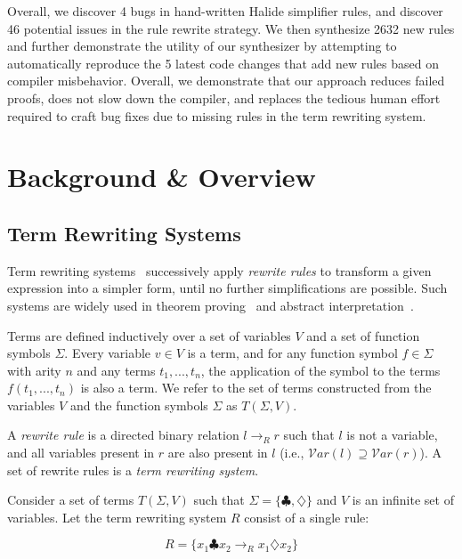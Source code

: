 \documentclass[sigplan,10pt,review,anonymous]{acmart}\settopmatter{printfolios=true,printccs=false,printacmref=false}
\newcommand{\NumRulesFixed}{{\color{red} 4}\xspace}
\newcommand{\NumOrderingProblems}{{\color{red} 46}\xspace}
\newcommand{\NumRulesSynthesized}{{\color{red} 2632}\xspace}
\newcommand{\NumBugsAutomated}{{\color{red} 5}\xspace}
\begin{document}
Overall, we discover \NumRulesFixed bugs in hand-written Halide simplifier rules, and discover \NumOrderingProblems
potential issues in the rule rewrite strategy.  We then synthesize \NumRulesSynthesized new rules 
and further demonstrate the utility of our synthesizer by attempting to
automatically reproduce the \NumBugsAutomated latest code changes that add new
rules based on compiler misbehavior.
Overall, we demonstrate that our approach
reduces failed proofs,  does not slow down the compiler, and replaces the
tedious human effort required to craft bug fixes due to missing rules in the
term rewriting system.

\section{Background \& Overview}
\subsection{Term Rewriting Systems}
Term rewriting systems~\cite{gorn1967} successively apply \textit{rewrite rules} to transform a given
expression into a simpler form, until no further simplifications are possible.  Such systems are widely
used in theorem proving~\cite{baader1999term} and abstract interpretation~\cite{}.

Terms are defined inductively over a set of variables $V$ and a set of function symbols $\Sigma$. Every variable $v \in V$ is a term, and for any function symbol $f \in \Sigma$ with arity $n$ and any terms $t_1, ..., t_n$, the application of the symbol to the terms $f(t_1, ..., t_n)$ is also a term. We refer to the set of terms constructed from the variables $V$ and the function symbols $\Sigma$ as $T(\Sigma, V)$.

A \emph{rewrite rule} is a directed binary relation $l \rightarrow_R r$ such that $l$ is not a variable, and all variables present in $r$ are also present in $l$ (i.e., $\mathcal{V}ar(l) \supseteq \mathcal{V}ar(r)$). A set of rewrite rules is a \emph{term rewriting system}.

Consider a set of terms $T(\Sigma, V)$ such that $\Sigma = \{\clubsuit, \diamondsuit\}$ and $V$ is an infinite set of variables. Let the term rewriting system $R$ consist of a single rule:

\[ R = \{ x_1 \clubsuit x_2 \rightarrow_R x_1 \diamondsuit x_2 \} \]
\end{document}
